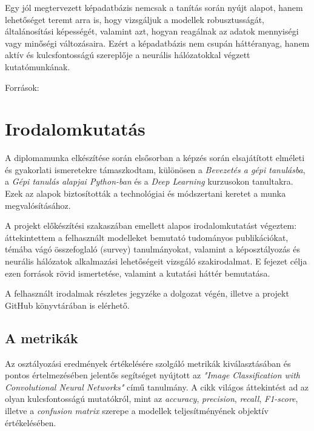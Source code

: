             Egy jól megtervezett képadatbázis nemcsak a tanítás során nyújt alapot, hanem lehetőséget teremt arra is, hogy vizsgáljuk a modellek robusztusságát, általánosítási képességét, valamint azt, hogyan reagálnak az adatok mennyiségi vagy minőségi változásaira. Ezért a képadatbázis nem csupán háttéranyag, hanem aktív és kulcsfontosságú szereplője a neurális hálózatokkal végzett kutatómunkának.
            
            \begin{flushright}
                \small
                Források: \cite{article_cnn_metrics} \cite{article_cnn_survey}  \cite{ardicle_dl_survey} 
            \end{flushright}
            
            \section{Irodalomkutatás}

            A diplomamunka elkészítése során elsősorban a képzés során elsajátított elméleti és gyakorlati ismeretekre támaszkodtam, különösen a \textit{Bevezetés a gépi tanulásba}, a \textit{Gépi tanulás alapjai Python-ban} és a \textit{Deep Learning} kurzusokon tanultakra. Ezek az alapok biztosították a technológiai és módszertani keretet a munka megvalósításához.
            
            A projekt előkészítési szakaszában emellett alapos irodalomkutatást végeztem: áttekintettem a felhasznált modelleket bemutató tudományos publikációkat, témába vágó összefoglaló (survey) tanulmányokat, valamint a képosztályozás és neurális hálózatok alkalmazási lehetőségeit vizsgáló szakirodalmat. E fejezet célja ezen források rövid ismertetése, valamint a kutatási háttér bemutatása.
            
            A felhasznált irodalmak részletes jegyzéke a dolgozat végén, illetve a projekt GitHub könyvtárában is elérhető.
            
            \subsection{A metrikák}
            
            Az osztályozási eredmények értékelésére szolgáló metrikák kiválasztásában és pontos értelmezésében jelentős segítséget nyújtott az \textit{"Image Classification with Convolutional Neural Networks"} \cite{article_cnn_metrics} című tanulmány. A cikk világos áttekintést ad az olyan kulcsfontosságú mutatókról, mint az \textit{accuracy}, \textit{precision}, \textit{recall}, \textit{F1-score}, illetve a \textit{confusion matrix} szerepe a modellek teljesítményének objektív értékelésében.            

